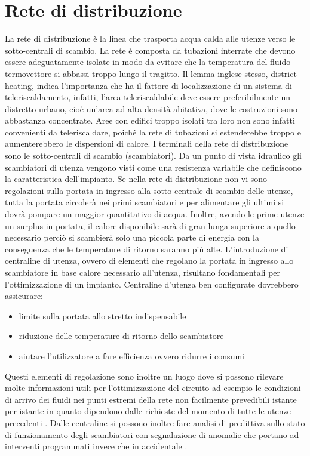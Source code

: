 \documentclass[laurea,oneside,11pt]{USiena_tesiLM}
\begin{document}
\section{Rete di distribuzione}
La rete di distribuzione è la linea che trasporta acqua calda alle utenze verso le sotto-centrali di scambio. La rete è composta da tubazioni interrate che  devono  essere adeguatamente isolate  in  modo  da  evitare  che  la temperatura  del fluido termovettore si abbassi troppo lungo il tragitto. 
Il  lemma  inglese  stesso,  district  heating,  indica  l'importanza  che  ha  il  fattore  di localizzazione  di un sistema  di  teleriscaldamento, infatti,  l'area  teleriscaldabile  deve  essere  preferibilmente  un distretto  urbano,  cioè  un'area  ad  alta  densità  abitativa,  dove  le  costruzioni  sono abbastanza concentrate.
Aree  con  edifici  troppo  isolati  tra  loro  non  sono  infatti  convenienti  da  teleriscaldare, poiché
la rete di tubazioni si estenderebbe troppo e aumenterebbero le dispersioni di calore.
I terminali della rete di distribuzione sono le sotto-centrali di scambio (scambiatori). Da un punto di vista idraulico gli scambiatori di utenza vengono visti come una resistenza variabile che definiscono la caratteristica dell'impianto. 
Se nella rete di distribuzione non vi sono regolazioni sulla portata in ingresso alla sotto-centrale di scambio delle utenze, tutta la portata circolerà nei primi scambiatori e per alimentare gli ultimi si dovrà pompare un maggior quantitativo di acqua. Inoltre, avendo le prime utenze un surplus in portata, il calore disponibile sarà di gran lunga superiore a quello necessario perciò si scambierà solo una piccola parte di energia con la conseguenza che le temperature di ritorno saranno più alte.
L'introduzione di centraline di utenza, ovvero di elementi che regolano la portata in ingresso allo scambiatore in base calore necessario all'utenza, risultano fondamentali per l'ottimizzazione di un impianto.  Centraline d'utenza ben configurate dovrebbero assicurare:
\begin{itemize}
\item limite sulla portata allo stretto indispensabile
\item riduzione delle temperature di ritorno dello scambiatore
\item aiutare l'utilizzatore a fare efficienza ovvero ridurre i consumi
\end{itemize} 
Questi elementi di regolazione sono inoltre un luogo dove si possono rilevare molte informazioni utili per l'ottimizzazione del circuito ad esempio le condizioni di arrivo dei fluidi nei punti estremi della rete non facilmente prevedibili istante per istante in quanto dipendono dalle richieste del momento di tutte le utenze precedenti .
Dalle centraline si possono inoltre fare analisi di predittiva sullo stato di funzionamento degli scambiatori con segnalazione di anomalie che portano ad interventi programmati invece che in accidentale .
\end{document}
